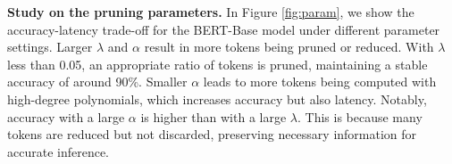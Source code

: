 




\noindent\textbf{Study on the pruning parameters.} In Figure \ref{fig:param}, we show the accuracy-latency trade-off for the BERT-Base model under different parameter settings. Larger 
$\lambda$ and $\alpha$ result in more tokens being pruned or reduced. With $\lambda$ less than 0.05, an appropriate ratio of tokens is pruned, maintaining a stable accuracy of around 90\%. Smaller $\alpha$ leads to more tokens being computed with high-degree polynomials, which increases accuracy but also latency. Notably, accuracy with a large $\alpha$ is higher than with a large $\lambda$. This is because many tokens are reduced but not discarded, preserving necessary information for accurate inference.




